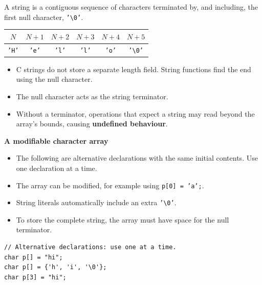 \documentclass[11pt,a4paper]{article}
\begin{document}


A string is a contiguous sequence of characters terminated by,
and including, the first null character,
\texttt{'\textbackslash0'}.

\begin{center}
\begin{tabular}{@{}*{6}{c}@{}}
\toprule
\(N\) & \(N+1\) & \(N+2\) & \(N+3\) & \(N+4\) & \(N+5\) \\
\midrule
\texttt{'H'} &
\texttt{'e'} &
\texttt{'l'} &
\texttt{'l'} &
\texttt{'o'} &
\texttt{'\textbackslash0'} \\
\bottomrule
\end{tabular}
\end{center}

\begin{itemize}
    \item C strings do not store a separate length field.
          String functions find the end using the null character.
    \item The null character acts as the string terminator.
    \item Without a terminator, operations that expect a string
          may read beyond the array's bounds, causing
          \textbf{undefined behaviour}.
\end{itemize}


\textbf{A modifiable character array}

\begin{itemize}
    \item The following are alternative declarations with the same
          initial contents. Use one declaration at a time.
    \item The array can be modified, for example using
          \texttt{p[0] = 'a';}.
    \item String literals automatically include an extra
          \texttt{'\textbackslash0'}.
    \item To store the complete string, the array must have space
          for the null terminator.
\end{itemize}

\begin{lstlisting}[style=cscode]
// Alternative declarations: use one at a time.
char p[] = "hi";
char p[] = {'h', 'i', '\0'};
char p[3] = "hi";
\end{lstlisting}
\end{document}
